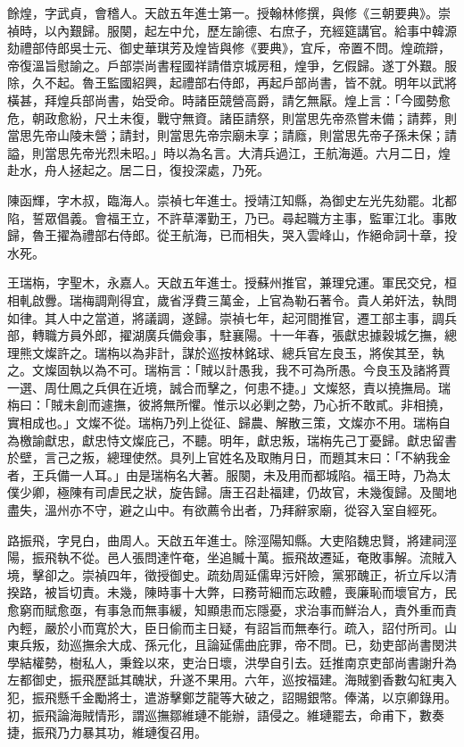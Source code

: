 \begin{pinyinscope}
餘煌，字武貞，會稽人。天啟五年進士第一。授翰林修撰，與修《三朝要典》。崇禎時，以內艱歸。服闋，起左中允，歷左諭德、右庶子，充經筵講官。給事中韓源劾禮部侍郎吳士元、御史華琪芳及煌皆與修《要典》，宜斥，帝置不問。煌疏辯，帝復溫旨慰諭之。戶部崇尚書程國祥請借京城房租，煌爭，乞假歸。遂丁外艱。服除，久不起。魯王監國紹興，起禮部右侍郎，再起戶部尚書，皆不就。明年以武將橫甚，拜煌兵部尚書，始受命。時諸臣競營高爵，請乞無厭。煌上言：「今國勢愈危，朝政愈紛，尺土未復，戰守無資。諸臣請祭，則當思先帝烝嘗未備；請葬，則當思先帝山陵未營；請封，則當思先帝宗廟未享；請廕，則當思先帝子孫未保；請謚，則當思先帝光烈未昭。」時以為名言。大清兵過江，王航海遁。六月二日，煌赴水，舟人拯起之。居二日，復投深處，乃死。

陳函輝，字木叔，臨海人。崇禎七年進士。授靖江知縣，為御史左光先劾罷。北都陷，誓眾倡義。會福王立，不許草澤勤王，乃已。尋起職方主事，監軍江北。事敗歸，魯王擢為禮部右侍郎。從王航海，已而相失，哭入雲峰山，作絕命詞十章，投水死。

王瑞栴，字聖木，永嘉人。天啟五年進士。授蘇州推官，兼理兌運。軍民交兌，桓相軋啟釁。瑞梅調劑得宜，歲省浮費三萬金，上官為勒石著令。貴人弟奸法，執問如律。其人中之當道，將議調，遂歸。崇禎七年，起河間推官，遷工部主事，調兵部，轉職方員外郎，擢湖廣兵備僉事，駐襄陽。十一年春，張獻忠據穀城乞撫，總理熊文燦許之。瑞栴以為非計，謀於巡按林銘球、總兵官左良玉，將俟其至，執之。文燦固執以為不可。瑞栴言：「賊以計愚我，我不可為所愚。今良玉及諸將賈一選、周仕鳳之兵俱在近境，誠合而擊之，何患不捷。」文燦怒，責以撓撫局。瑞栴曰：「賊未創而遽撫，彼將無所懼。惟示以必剿之勢，乃心折不敢貳。非相撓，實相成也。」文燦不從。瑞栴乃列上從征、歸農、解散三策，文燦亦不用。瑞栴自為檄諭獻忠，獻忠恃文燦庇己，不聽。明年，獻忠叛，瑞栴先己丁憂歸。獻忠留書於壁，言己之叛，總理使然。具列上官姓名及取賄月日，而題其末曰：「不納我金者，王兵備一人耳。」由是瑞栴名大著。服闋，未及用而都城陷。福王時，乃為太僕少卿，極陳有司虐民之狀，旋告歸。唐王召赴福建，仍故官，未幾復歸。及閩地盡失，溫州亦不守，避之山中。有欲薦令出者，乃拜辭家廟，從容入室自經死。

路振飛，字見白，曲周人。天啟五年進士。除涇陽知縣。大吏陷魏忠賢，將建祠涇陽，振飛執不從。邑人張問達忤奄，坐追贓十萬。振飛故遷延，奄敗事解。流賊入境，擊卻之。崇禎四年，徵授御史。疏劾周延儒卑污奸險，黨邪醜正，祈立斥以清揆路，被旨切責。未幾，陳時事十大弊，曰務苛細而忘政體，喪廉恥而壞官方，民愈窮而賦愈亟，有事急而無事緩，知顯患而忘隱憂，求治事而鮮治人，責外重而責內輕，嚴於小而寬於大，臣日偷而主日疑，有詔旨而無奉行。疏入，詔付所司。山東兵叛，劾巡撫余大成、孫元化，且論延儒曲庇罪，帝不問。已，劾吏部尚書閔洪學結權勢，樹私人，秉銓以來，吏治日壞，洪學自引去。廷推南京吏部尚書謝升為左都御史，振飛歷詆其醜狀，升遂不果用。六年，巡按福建。海賊劉香數勾紅夷入犯，振飛懸千金勵將士，遣游擊鄭芝龍等大破之，詔賜銀幣。俸滿，以京卿錄用。初，振飛論海賊情形，謂巡撫鄒維璉不能辦，語侵之。維璉罷去，命甫下，數奏捷，振飛乃力暴其功，維璉復召用。


\end{pinyinscope}

